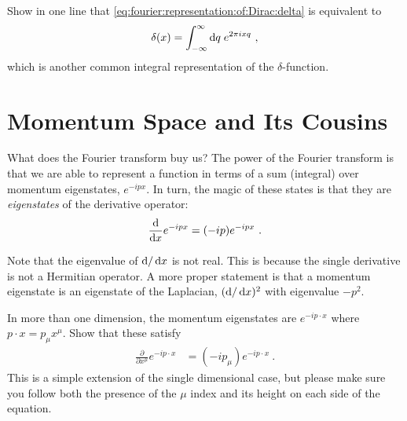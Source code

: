 \begin{exercise}
Show in one line that \eqref{eq:fourier:representation:of:Dirac:delta} is equivalent to
\begin{align}
    \delta(x) = \int_{-\infty}^\infty \operatorname{d}\mkern-3mu^{}\mkern-1mu{q}\; e^{2\pi i xq} \ ,
\end{align}
which is another common integral representation of the $\delta$-function.
\end{exercise}

\section{Momentum Space and Its Cousins}

What does the Fourier transform buy us? The power of the Fourier transform is that we are able to represent a function in terms of a sum (integral) over momentum eigenstates, $e^{-ipx}$. In turn, the magic of these states is that they are \emph{eigenstates} of the derivative operator:
\begin{align}
    \frac{\operatorname{d}\mkern-3mu^{}\mkern-1mu{}}{\operatorname{d}\mkern-3mu^{}\mkern-1mu{x}} e^{-ipx} = (-ip) e^{-ipx} \ .
\end{align}
\begin{example}
Note that the eigenvalue of $\operatorname{d}\mkern-3mu^{}\mkern-1mu{}/\operatorname{d}\mkern-3mu^{}\mkern-1mu{x}$ is not real. This is because the single derivative is not a Hermitian operator. A more proper statement is that a momentum eigenstate is an eigenstate of the Laplacian, $(\operatorname{d}\mkern-3mu^{}\mkern-1mu{}/\operatorname{d}\mkern-3mu^{}\mkern-1mu{x})^2$ with eigenvalue $-p^2$.
\end{example}
\begin{exercise}
In more than one dimension, the momentum eigenstates are $e^{-i p\cdot x}$ where $p\cdot x = p_\mu x^\mu$. Show that these satisfy
\begin{align}
    \frac{\partial}{\partial x^\mu} e^{-ip\cdot x}
    &= (-ip_\mu) e^{-ip\cdot x} \ .
\end{align}
This is a simple extension of the single dimensional case, but please make sure you follow both the presence of the $\mu$ index and its height on each side of the equation.
\end{exercise}

